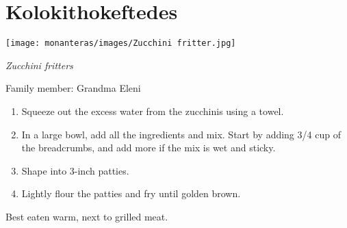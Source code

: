 \chapter{Kolokithokeftedes}
\label{ch:kolokithokeftedes}


\begin{marginfigure}
  \texttt{[image: monanteras/images/Zucchini fritter.jpg]}
\end{marginfigure}

\textit{Zucchini fritters}

Family member: Grandma Eleni

\begin{enumerate}
    \item Squeeze out the excess water from the zucchinis using a towel.
    \item In a large bowl, add all the ingredients and mix. Start by adding 3/4 cup of the breadcrumbs, and add more if the mix is wet and sticky.
    \item Shape into 3-inch patties.
    \item Lightly flour the patties and fry until golden brown.
\end{enumerate}

Best eaten warm, next to grilled meat.


